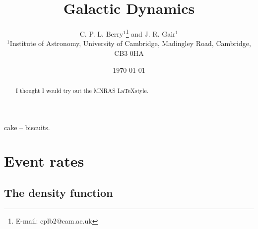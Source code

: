 \documentclass[useAMS,usedcolumn,usegraphicx,usenatbib]{mn2e}
\title[Galactic Dynamics]{Galactic Dynamics}
\author[C. P. L. Berry and J. R. Gair]{C. P. L. Berry$^{1}$\thanks{E-mail:
cplb2@cam.ac.uk}  and J. R. Gair$^{1}$\\
$^{1}$Institute of Astronomy, University of Cambridge, Madingley Road, Cambridge, CB3 0HA}
\begin{document}
\date{\today}

\pagerange{\pageref{firstpage}--\pageref{lastpage}} 

\maketitle

\label{firstpage}

\begin{abstract}
I thought I would try out the MNRAS \LaTeX style.
\end{abstract}

\begin{keywords}
cake -- biscuits.
\end{keywords}

\section{Event rates}

\subsection{The density function}
\end{document}
